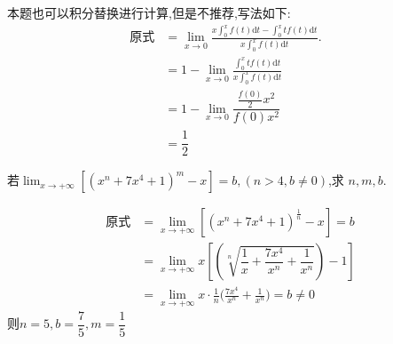 \documentclass[8pt a4paper, oneside, UTF8]{ctexbook}
\begin{document}
\begin{sloppypar}
\begin{note}
        本题也可以积分替换进行计算,但是不推荐,写法如下:
        \begin{align*}
            \text{原式} & = \lim_{x\to0}\frac{x\int_{0}^{x}f(t)\mathrm{d}t-\int_{0}^{x}tf\left(t\right)\mathrm{d}t}{x\!\int_{0}^{x}f(t)\mathrm{d}t}. & \\
                      & = 1-\lim_{x\to0}\frac{\int_{0}^{x}tf\left(t\right)\mathrm{d}t}{x\int_{0}^{x}f\left(t\right)\mathrm{d}t}                    & \\
                      & =1-\lim_{x\to0}\dfrac{\frac{f\left(0\right)}{2}x^{2}}{f\left(0\right)x^{2}}                                                & \\
                      & =\dfrac{1}{2}
        \end{align*}
    \end{note}
    \begin{problem}
    若$\lim_{x\to+\infty}[(x^n+7x^4+1)^m-x]=b,(n>4,b\neq0)$,求 $n,m,b.$
    \end{problem}
    \begin{solution}
        \begin{align*}
            \text{原式} & = \lim_{x \to +\infty} [(x^n+7x^4+1)^{\frac{1}{n}}-x]=b                                 \\
                      & =   \lim_{x \to +\infty} x[(\sqrt[n]{\dfrac{1}{x}+\dfrac{7x^4}{x^n}+\dfrac{1}{x^n}})-1] \\
                      & = \lim_{x\to+\infty}x\cdot\frac1n\Big(\frac{7x^4}{x^n}+\frac1{x^n}\Big)=b\neq0
        \end{align*}
        则$n=5,b=\dfrac{7}{5},m=\dfrac{1}{5}$
    \end{solution}

\end{sloppypar}
\end{document}
